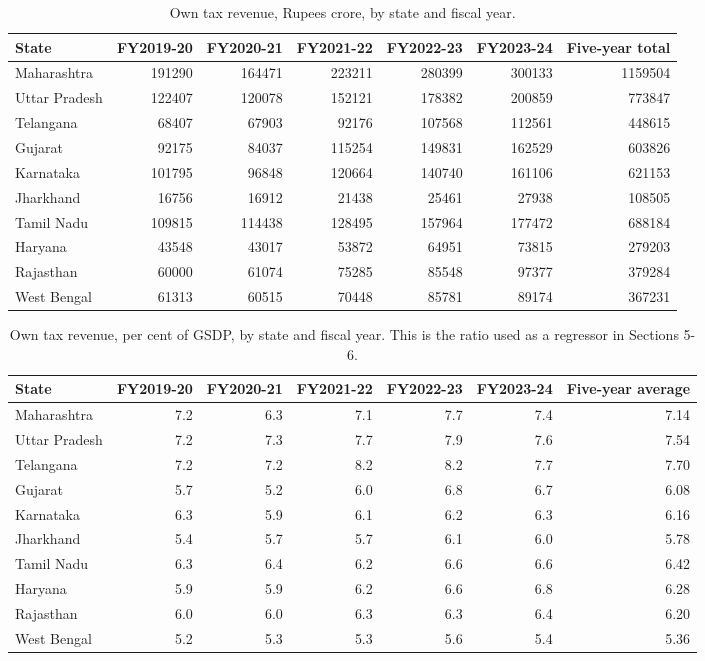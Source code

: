 \documentclass[12pt,a4paper]{article}
\begin{document}
\begin{table}[H]
\centering
\caption{Own tax revenue, Rupees crore, by state and fiscal year.}
\label{tab:5}
\footnotesize
\begin{adjustbox}{max width=\textwidth}
\begin{tabular}{@{}lrrrrrr@{}}
\toprule
State & FY2019-20 & FY2020-21 & FY2021-22 & FY2022-23 & FY2023-24 & Five-year total \\
\midrule
Maharashtra & 191290 & 164471 & 223211 & 280399 & 300133 & 1159504 \\
Uttar Pradesh & 122407 & 120078 & 152121 & 178382 & 200859 & 773847 \\
Telangana & 68407 & 67903 & 92176 & 107568 & 112561 & 448615 \\
Gujarat & 92175 & 84037 & 115254 & 149831 & 162529 & 603826 \\
Karnataka & 101795 & 96848 & 120664 & 140740 & 161106 & 621153 \\
Jharkhand & 16756 & 16912 & 21438 & 25461 & 27938 & 108505 \\
Tamil Nadu & 109815 & 114438 & 128495 & 157964 & 177472 & 688184 \\
Haryana & 43548 & 43017 & 53872 & 64951 & 73815 & 279203 \\
Rajasthan & 60000 & 61074 & 75285 & 85548 & 97377 & 379284 \\
West Bengal & 61313 & 60515 & 70448 & 85781 & 89174 & 367231 \\
\bottomrule
\end{tabular}
\end{adjustbox}
\end{table}

\begin{table}[H]
\centering
\caption{Own tax revenue, per cent of GSDP, by state and fiscal year. This is the ratio used as a regressor in Sections 5-6.}
\label{tab:6}
\footnotesize
\begin{adjustbox}{max width=\textwidth}
\begin{tabular}{@{}lrrrrrr@{}}
\toprule
State & FY2019-20 & FY2020-21 & FY2021-22 & FY2022-23 & FY2023-24 & Five-year average \\
\midrule
Maharashtra & 7.2 & 6.3 & 7.1 & 7.7 & 7.4 & 7.14 \\
Uttar Pradesh & 7.2 & 7.3 & 7.7 & 7.9 & 7.6 & 7.54 \\
Telangana & 7.2 & 7.2 & 8.2 & 8.2 & 7.7 & 7.70 \\
Gujarat & 5.7 & 5.2 & 6.0 & 6.8 & 6.7 & 6.08 \\
Karnataka & 6.3 & 5.9 & 6.1 & 6.2 & 6.3 & 6.16 \\
Jharkhand & 5.4 & 5.7 & 5.7 & 6.1 & 6.0 & 5.78 \\
Tamil Nadu & 6.3 & 6.4 & 6.2 & 6.6 & 6.6 & 6.42 \\
Haryana & 5.9 & 5.9 & 6.2 & 6.6 & 6.8 & 6.28 \\
Rajasthan & 6.0 & 6.0 & 6.3 & 6.3 & 6.4 & 6.20 \\
West Bengal & 5.2 & 5.3 & 5.3 & 5.6 & 5.4 & 5.36 \\
\bottomrule
\end{tabular}
\end{adjustbox}
\end{table}
\end{document}
